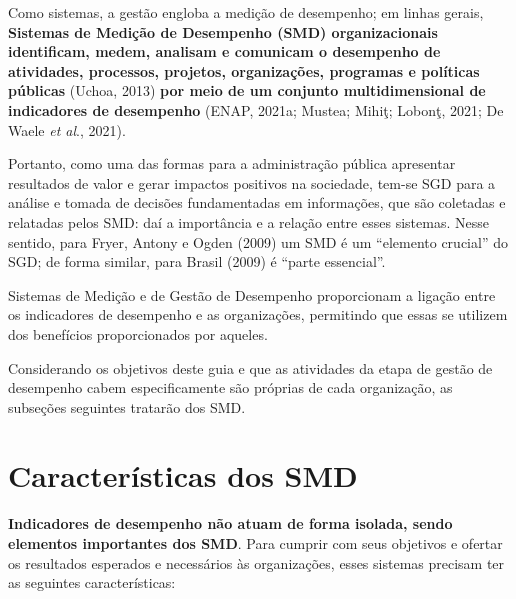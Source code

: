 \documentclass[
  letterpaper,
  DIV=11,
  numbers=noendperiod]{scrreprt}
\begin{document}
Como sistemas, a gestão engloba a medição de desempenho; em linhas
gerais, \textbf{Sistemas de Medição de Desempenho (SMD) organizacionais
identificam, medem, analisam e comunicam o desempenho de atividades,
processos, projetos, organizações, programas e políticas públicas}
(Uchoa, 2013) \textbf{por meio de um conjunto multidimensional de
indicadores de desempenho} (ENAP, 2021a; Mustea; Mihiţ; Lobonţ, 2021; De
Waele \emph{et al}., 2021).

Portanto, como uma das formas para a administração pública apresentar
resultados de valor e gerar impactos positivos na sociedade, tem-se SGD
para a análise e tomada de decisões fundamentadas em informações, que
são coletadas e relatadas pelos SMD: daí a importância e a relação entre
esses sistemas. Nesse sentido, para Fryer, Antony e Ogden (2009) um SMD
é um ``elemento crucial'' do SGD; de forma similar, para Brasil (2009) é
``parte essencial''.

\begin{tcolorbox}[enhanced jigsaw, colframe=quarto-callout-note-color-frame, opacityback=0, toprule=.15mm, breakable, leftrule=.75mm, title=\textcolor{quarto-callout-note-color}{\faInfo}\hspace{0.5em}{Nota}, rightrule=.15mm, colbacktitle=quarto-callout-note-color!10!white, colback=white, arc=.35mm, bottomtitle=1mm, toptitle=1mm, bottomrule=.15mm, titlerule=0mm, opacitybacktitle=0.6, coltitle=black, left=2mm]

Sistemas de Medição e de Gestão de Desempenho proporcionam a ligação
entre os indicadores de desempenho e as organizações, permitindo que
essas se utilizem dos benefícios proporcionados por aqueles.

\end{tcolorbox}

Considerando os objetivos deste guia e que as atividades da etapa de
gestão de desempenho cabem especificamente são próprias de cada
organização, as subseções seguintes tratarão dos SMD.

\hypertarget{caracteruxedsticas-dos-smd}{%
\section{Características dos SMD}\label{caracteruxedsticas-dos-smd}}

\textbf{Indicadores de desempenho não atuam de forma isolada, sendo
elementos importantes dos SMD}. Para cumprir com seus objetivos e
ofertar os resultados esperados e necessários às organizações, esses
sistemas precisam ter as seguintes características:
\end{document}
